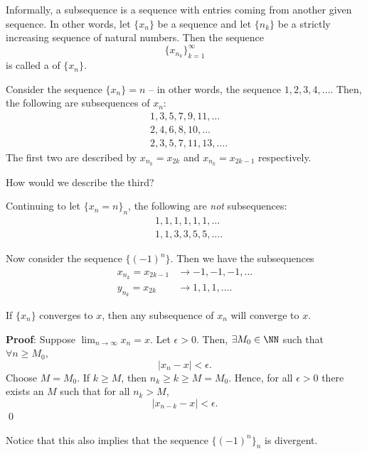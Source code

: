 \begin{definition}[Subsequence]
Informally, a subsequence is a sequence with entries coming from another given sequence. In other words, let $\{x_n\}$ be a sequence and let $\{n_k\}$ be a strictly increasing sequence of natural numbers. Then the sequence 
\[
\{x_{n_k}\}_{k=1}^\infty
\]
is called a  of $\{x_n\}$.
\end{definition}

Consider the sequence $\{x_n\} = n$ -- in other words, the sequence $1,2,3,4,\dots$. Then, the following are subsequences of $x_n:$
\begin{align*}
    &1,3,5,7,9,11,\dots \\
    &2,4,6,8,10,\dots \\
    &2,3,5,7,11,13,\dots.
\end{align*}
The first two are described by $x_{n_k} = x_{2k}$ and $x_{n_k} = x_{2k-1}$ respectively. 

\begin{question}
How would we describe the third?
\end{question}

Continuing to let $\{x_n = n\}_n$, the following are \textit{not} subsequences:
\begin{align*}
    &1,1,1,1,1,1,\dots \\
    &1,1,3,3,5,5,\dots.
\end{align*}

Now consider the sequence $\{(-1)^n\}$. Then we have the subsequences
\begin{align*}
    x_{n_k} = x_{2k-1} &\to  -1,-1,-1,\dots \\
    y_{n_k} = x_{2k} &\to  1,1,1,\dots.
\end{align*}

\begin{theorem}
If $\{x_n\}$ converges to $x$, then any subsequence of $x_n$ will converge to $x$.
\end{theorem}
\textbf{Proof}: Suppose $\lim_{n\to \infty}x_n = x$. Let $\epsilon >0$. Then, $\exists M_0 \in \NN$ such that $\forall n\geq M_0$,
\[
|x_n-x|<\epsilon.
\]
Choose $M = M_0$. If $k\geq M$, then $n_k \geq k \geq M = M_0$. Hence, for all $\epsilon>0$ there exists an $M$ such that for all $n_k >M$,
\[
|x_{n-k}-x|<\epsilon.
\]
\qed 

\begin{remark}
Notice that this also implies that the sequence $\{(-1)^n\}_n$ is divergent.
\end{remark}

